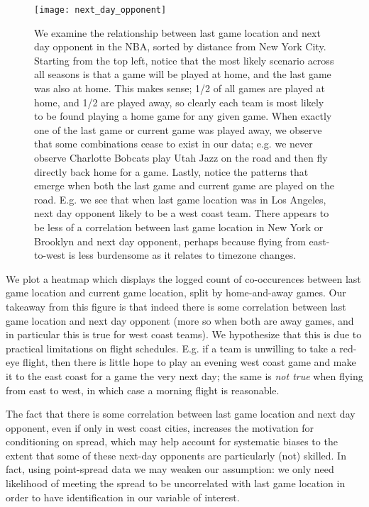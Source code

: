 \documentclass[letterpaper,12pt]{article}
\begin{document}
\begin{figure}
  \centering
  \label{fig: next day opponent}
  \texttt{[image: next\_day\_opponent]}
  \caption{We examine the relationship between last game location and next day opponent in the NBA, sorted by distance from New York City. 
Starting from the top left, notice that the most likely scenario across all seasons is that a game will be played at home, and the last game was also at home. This makes sense; 1/2 of all games are played at home, and 1/2 are played away, so clearly each team is most likely to be found playing a home game for any given game. When exactly one of the last game or current game was played away,
we observe that some combinations cease to exist in our data; e.g. we never observe Charlotte Bobcats play Utah Jazz on the road and then fly directly back home for a game. Lastly, notice the patterns that emerge when both the last game and current game are played on the road. E.g. we see that when last game location was in Los Angeles, next day opponent likely to be a west coast team. There appears to be less of a correlation between last game location in New York or Brooklyn and next day opponent, perhaps because flying from east-to-west
is less burdensome as it relates to timezone changes.} 
\end{figure}

We plot a heatmap which displays the logged count of co-occurences between last game
location and current game location, split by home-and-away games.
Our takeaway from this figure is that indeed there is some correlation between last game location
and next day opponent (more so when both are away games,  
and in particular this is true for west coast teams). We hypothesize that
this is due to practical limitations on flight schedules. E.g. if a team is unwilling to take a red-eye
flight, then there is little hope to play an evening west coast game and make it to the east coast for a game the very next day;
the same is \emph{not true} when flying from east to west, in which case a morning flight is reasonable.


The fact that there is some correlation between last game location and next day opponent, even if only in west coast cities, increases the motivation for conditioning on spread, which may help account for systematic biases to the extent that some of these next-day opponents are particularly (not) skilled. 
In fact, using point-spread data we may weaken our assumption: we only need
likelihood of meeting the spread to be uncorrelated with last game location
in order to have identification in our variable of interest.
\end{document}
